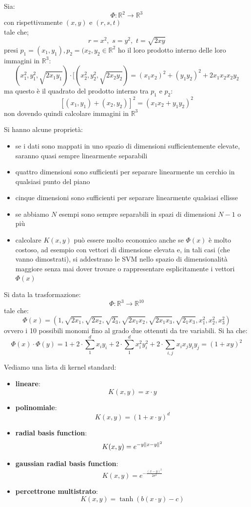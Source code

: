 \documentclass[a4paper,12pt, oneside]{book}
\begin{document}
\begin{esempio}
  Sia:
  \[\Phi:\mathbb{R}^2\to \mathbb{R}^3\]
  con rispettivamente $(x,y)$ e $(r,s,t)$\\
  tale che;
  \[r=x^2,\,\,s=y^2,\,\,t=\sqrt{2xy}\]
  presi $p_1=(x_1,y_1),p_2=(x_2,y_2\in\mathbb{R}^2$ ho il loro prodotto interno
  delle loro immagini in $\mathbb{R}^3$:
  \[(x_1^2,y_1^2,\sqrt{2x_1y_1})\cdot
    [(x_2^2,y_2^2,\sqrt{2x_2y_2})=(x_1x_2)^2+(y_1y_2)^2+2x_1x_2x_2y_2\]
  ma questo è il quadrato del prodotto interno tra $p_1$ e $p_2$:
  \[[(x_1,y_1)+(x_2,y_2)]^2=(x_1x_2+y_1y_2)^2\]
  non dovendo quindi calcolare immagini in $\mathbb{R}^3$
\end{esempio}
Si hanno alcune proprietà:
\begin{itemize}
  \item se i dati sono mappati in uno spazio di dimensioni sufficientemente
  elevate, saranno quasi sempre linearmente separabili
  \item quattro dimensioni sono sufficienti per separare linearmente un cerchio
  in qualsiasi punto del piano
  \item cinque dimensioni sono sufficienti per separare linearmente qualsiasi
  ellisse
  \item se abbiamo $N$ esempi sono sempre separabili in spazi di dimensioni
  $N-1$ o più
  \item calcolare $K(x,y)$ può essere molto economico anche se $\Phi(x)$ è molto
  costoso, ad esempio con vettori di dimensione elevata e, in tali casi (che
  vanno dimostrati), si
  addestrano le SVM nello spazio di dimensionalità maggiore senza mai dover
  trovare o rappresentare esplicitamente i vettori $\Phi(x)$
\end{itemize}
\begin{esempio}
  Si data la trasformazione:
  \[\Phi:\mathbb{R}^3\to \mathbb{R}^{10}\]
  tale che:
  \[\Phi(x)=(1,
    \sqrt{2x_1},\sqrt{2x_2},\sqrt{2_3},\sqrt{2x_1x_2},\sqrt{2x_1x_3},
    \sqrt{2_1x_3},x_1^2,x_2^2,x_3^2)\]
  ovvero i 10 possibili monomi fino al grado due ottenuti da tre variabili. Si
  ha che:
  \[\Phi(x)\cdot\Phi(y)=1+2\cdot\sum_1^dx_iy_i+2\cdot\sum_1^dx_i^2y_i^2+2\cdot\sum_{i,j}
    x_ix_jy_iy_j=(1+xy)^2\]
  
\end{esempio}
Vediamo una lista di kernel standard:
\begin{itemize}
  \item \textbf{lineare}:
  \[K(x,y)=x\cdot y\]
  \item \textbf{polinomiale}:
  \[K(x,y)=(1+x\cdot y)^d\]
  \item \textbf{radial basis function}:
  \[K(x,y)=e^{-y\norm{x-y}^2}\]
  \item \textbf{gaussian radial basis function}:
  \[K(x,y)=e^{-\frac{(x-y)^2}{2\sigma^2}}\]
  \item \textbf{percettrone multistrato}:
  \[K(x,y)=\tanh (b(x\cdot y) -c)\]
\end{itemize}
\end{document}
